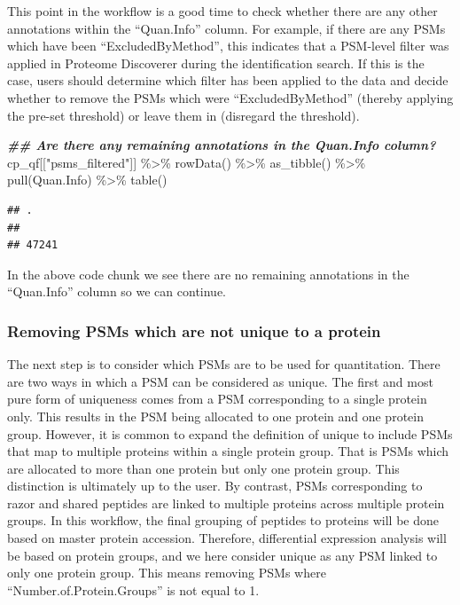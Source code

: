 \documentclass[9pt,a4paper,]{extarticle}
\newenvironment{Shaded}{\begin{snugshade}}{\end{snugshade}}
\newcommand{\DocumentationTok}[1]{\textcolor[rgb]{0.56,0.35,0.01}{\textbf{\textit{#1}}}}
\newcommand{\FunctionTok}[1]{\textcolor[rgb]{0.00,0.00,0.00}{#1}}
\newcommand{\NormalTok}[1]{#1}
\newcommand{\SpecialCharTok}[1]{\textcolor[rgb]{0.00,0.00,0.00}{#1}}
\newcommand{\StringTok}[1]{\textcolor[rgb]{0.31,0.60,0.02}{#1}}
\begin{document}
This point in the workflow is a good time to check whether there are any other
annotations within the ``Quan.Info'' column. For example, if there are any PSMs
which have been ``ExcludedByMethod'', this indicates that a PSM-level filter was
applied in Proteome Discoverer during the identification search. If this is the
case, users should determine which filter has been applied to the data and
decide whether to remove the PSMs which were ``ExcludedByMethod'' (thereby applying
the pre-set threshold) or leave them in (disregard the threshold).

\begin{Shaded}
\begin{Highlighting}[]
\DocumentationTok{\#\# Are there any remaining annotations in the Quan.Info column?}
\NormalTok{cp\_qf[[}\StringTok{"psms\_filtered"}\NormalTok{]] }\SpecialCharTok{\%\textgreater{}\%} 
  \FunctionTok{rowData}\NormalTok{() }\SpecialCharTok{\%\textgreater{}\%} 
  \FunctionTok{as\_tibble}\NormalTok{() }\SpecialCharTok{\%\textgreater{}\%} 
  \FunctionTok{pull}\NormalTok{(Quan.Info) }\SpecialCharTok{\%\textgreater{}\%} 
  \FunctionTok{table}\NormalTok{()}
\end{Highlighting}
\end{Shaded}

\begin{verbatim}
## .
##       
## 47241
\end{verbatim}

In the above code chunk we see there are no remaining annotations in the
``Quan.Info'' column so we can continue.

\hypertarget{removing-psms-which-are-not-unique-to-a-protein}{%
\subsubsection{Removing PSMs which are not unique to a protein}\label{removing-psms-which-are-not-unique-to-a-protein}}

The next step is to consider which PSMs are to be used for quantitation. There
are two ways in which a PSM can be considered as unique. The first and most pure
form of uniqueness comes from a PSM corresponding to a single protein only. This
results in the PSM being allocated to one protein and one protein group.
However, it is common to expand the definition of unique to include PSMs that
map to multiple proteins within a single protein group. That is PSMs which are
allocated to more than one protein but only one protein group. This distinction
is ultimately up to the user. By contrast, PSMs corresponding to razor and
shared peptides are linked to multiple proteins across multiple protein groups.
In this workflow, the final grouping of peptides to proteins will be done based
on master protein accession. Therefore, differential expression analysis will be
based on protein groups, and we here consider unique as any PSM linked to only
one protein group. This means removing PSMs where ``Number.of.Protein.Groups'' is
not equal to 1.
\end{document}
